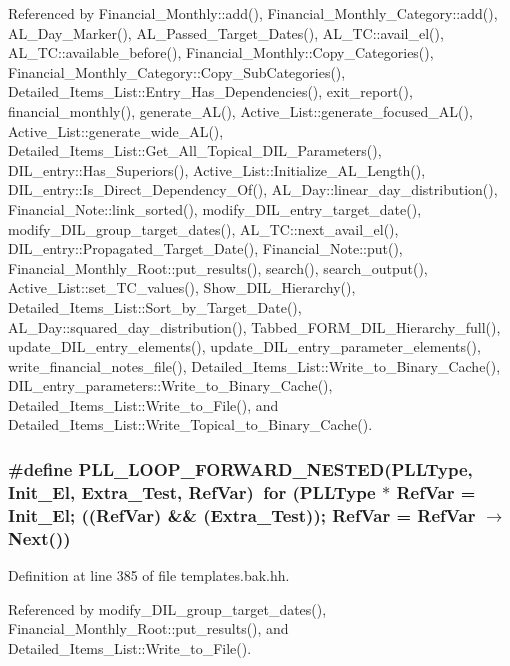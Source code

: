 Referenced by Financial\_\-Monthly::add(), Financial\_\-Monthly\_\-Category::add(), AL\_\-Day\_\-Marker(), AL\_\-Passed\_\-Target\_\-Dates(), AL\_\-TC::avail\_\-el(), AL\_\-TC::available\_\-before(), Financial\_\-Monthly::Copy\_\-Categories(), Financial\_\-Monthly\_\-Category::Copy\_\-Sub\-Categories(), Detailed\_\-Items\_\-List::Entry\_\-Has\_\-Dependencies(), exit\_\-report(), financial\_\-monthly(), generate\_\-AL(), Active\_\-List::generate\_\-focused\_\-AL(), Active\_\-List::generate\_\-wide\_\-AL(), Detailed\_\-Items\_\-List::Get\_\-All\_\-Topical\_\-DIL\_\-Parameters(), DIL\_\-entry::Has\_\-Superiors(), Active\_\-List::Initialize\_\-AL\_\-Length(), DIL\_\-entry::Is\_\-Direct\_\-Dependency\_\-Of(), AL\_\-Day::linear\_\-day\_\-distribution(), Financial\_\-Note::link\_\-sorted(), modify\_\-DIL\_\-entry\_\-target\_\-date(), modify\_\-DIL\_\-group\_\-target\_\-dates(), AL\_\-TC::next\_\-avail\_\-el(), DIL\_\-entry::Propagated\_\-Target\_\-Date(), Financial\_\-Note::put(), Financial\_\-Monthly\_\-Root::put\_\-results(), search(), search\_\-output(), Active\_\-List::set\_\-TC\_\-values(), Show\_\-DIL\_\-Hierarchy(), Detailed\_\-Items\_\-List::Sort\_\-by\_\-Target\_\-Date(), AL\_\-Day::squared\_\-day\_\-distribution(), Tabbed\_\-FORM\_\-DIL\_\-Hierarchy\_\-full(), update\_\-DIL\_\-entry\_\-elements(), update\_\-DIL\_\-entry\_\-parameter\_\-elements(), write\_\-financial\_\-notes\_\-file(), Detailed\_\-Items\_\-List::Write\_\-to\_\-Binary\_\-Cache(), DIL\_\-entry\_\-parameters::Write\_\-to\_\-Binary\_\-Cache(), Detailed\_\-Items\_\-List::Write\_\-to\_\-File(), and Detailed\_\-Items\_\-List::Write\_\-Topical\_\-to\_\-Binary\_\-Cache().
\subsubsection{\setlength{\rightskip}{0pt plus 5cm}\#define PLL\_\-LOOP\_\-FORWARD\_\-NESTED({\bf PLLType}, Init\_\-El, Extra\_\-Test, Ref\-Var)\ for ({\bf PLLType} $\ast$ Ref\-Var = Init\_\-El; ((Ref\-Var) \&\& (Extra\_\-Test)); Ref\-Var = Ref\-Var $\rightarrow$ Next())}\label{templates_8bak_8hh_a2}




Definition at line 385 of file templates.bak.hh.

Referenced by modify\_\-DIL\_\-group\_\-target\_\-dates(), Financial\_\-Monthly\_\-Root::put\_\-results(), and Detailed\_\-Items\_\-List::Write\_\-to\_\-File().
